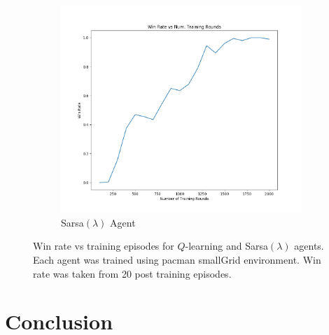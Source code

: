 \documentclass[10pt,conference]{IEEEtran}
\begin{document}
\begin{figure}[h]
		\begin{subfigure}[b]{0.40\textwidth}
			\includegraphics[width=\textwidth]{./images/qlearning_winrate}
			\caption{Sarsa\((\lambda)\) Agent}
		\end{subfigure}
		\caption{Win rate vs training episodes for \(Q\)-learning and
		Sarsa\((\lambda)\) agents.  Each agent was trained using 
		pacman smallGrid environment.  Win rate was taken from 
		20 post training episodes.}
		\label{winrate}
	\end{figure}

\section{Conclusion}
\label{sec:conclusion}



\end{document}
